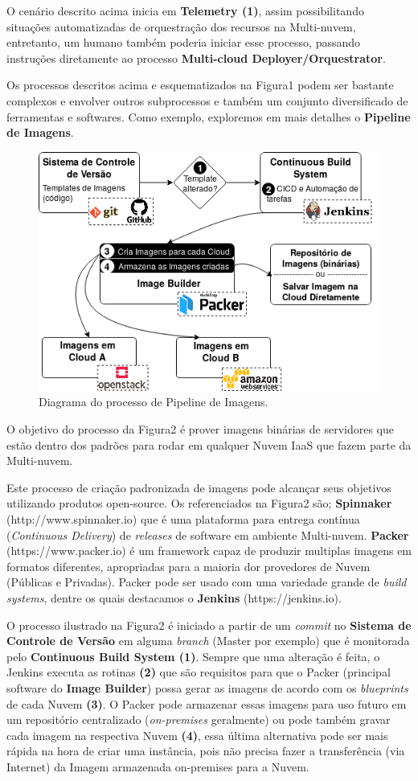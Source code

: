 \documentclass[12pt]{article}
\begin{document}
	O cenário descrito acima inicia em \textbf{Telemetry (1)}, assim possibilitando situações automatizadas de orquestração dos recursos na Multi-nuvem, entretanto, um humano também poderia iniciar esse processo, passando instruções diretamente ao processo \textbf{Multi-cloud Deployer/Orquestrator}.  
	
	Os processos descritos acima e esquematizados na Figura1 podem ser bastante complexos e envolver outros subprocessos e também um conjunto diversificado de ferramentas e softwares. Como exemplo, exploremos em mais detalhes o \textbf{Pipeline de Imagens}.
		
    \begin{figure}[H]
    	\centering
    	\includegraphics[width=0.7\linewidth]{figuras/Figure2.png}
    	\caption{Diagrama do processo de Pipeline de Imagens.}
    	\label{fig:figure2}
    \end{figure}
    
	O objetivo do processo da Figura2 é prover imagens binárias de servidores que estão dentro dos padrões para rodar em qualquer Nuvem IaaS que fazem parte da Multi-nuvem.
	
	Este processo de criação padronizada de imagens pode alcançar seus objetivos utilizando produtos open-source. Os referenciados na Figura2 são; \textbf{Spinnaker} (http://www.spinnaker.io) que é uma plataforma para entrega contínua (\textit{Continuous Delivery}) de \textit{releases} de software em ambiente Multi-nuvem. \textbf{Packer} (https://www.packer.io) é um framework capaz de produzir multiplas imagens em formatos diferentes, apropriadas para a maioria dor provedores de Nuvem (Públicas e Privadas). Packer pode ser usado com uma variedade grande de \textit{build systems}, dentre os quais destacamos o \textbf{Jenkins} (https://jenkins.io).

	O processo ilustrado na Figura2 é iniciado a partir de um \textit{commit} no \textbf{Sistema de Controle de Versão} em alguma \textit{branch} (Master por exemplo) que é monitorada pelo \textbf{Continuous Build System (1)}. Sempre que uma alteração é feita, o Jenkins executa as rotinas \textbf{(2)} que são requisitos para que o Packer (principal software do \textbf{Image Builder}) possa gerar as imagens de acordo com os \textit{blueprints} de cada Nuvem \textbf{(3)}. O Packer pode armazenar essas imagens para uso futuro em um repositório centralizado (\textit{on-premises} geralmente) ou pode também gravar cada imagem na respectiva Nuvem \textbf{(4)}, essa última alternativa pode ser mais rápida na hora de criar uma instância, pois não precisa fazer a transferência (via Internet) da Imagem armazenada on-premises para a Nuvem.
	
\end{document}
